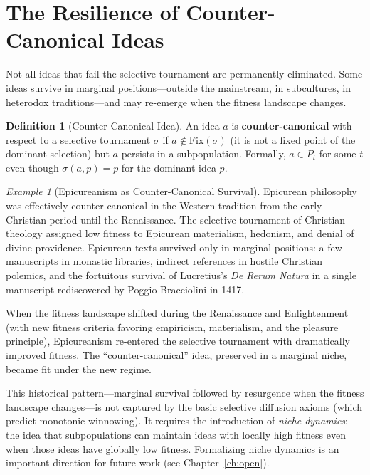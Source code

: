 \documentclass[11pt,openany]{book}
\theoremstyle{definition}
\newtheorem{definition}[axiom]{Definition}
\theoremstyle{plain}
\theoremstyle{remark}
\newtheorem{example}[axiom]{Example}
\begin{document}
\section{The Resilience of Counter-Canonical Ideas}

Not all ideas that fail the selective tournament are permanently eliminated. Some ideas survive in marginal positions---outside the mainstream, in subcultures, in heterodox traditions---and may re-emerge when the fitness landscape changes.

\begin{definition}[Counter-Canonical Idea]
An idea $a$ is \textbf{counter-canonical} with respect to a selective tournament $\sigma$ if $a \notin \mathrm{Fix}(\sigma)$ (it is not a fixed point of the dominant selection) but $a$ persists in a subpopulation. Formally, $a \in P_t$ for some $t$ even though $\sigma(a, p) = p$ for the dominant idea $p$.
\end{definition}

\begin{example}[Epicureanism as Counter-Canonical Survival]
Epicurean philosophy was effectively counter-canonical in the Western tradition from the early Christian period until the Renaissance. The selective tournament of Christian theology assigned low fitness to Epicurean materialism, hedonism, and denial of divine providence. Epicurean texts survived only in marginal positions: a few manuscripts in monastic libraries, indirect references in hostile Christian polemics, and the fortuitous survival of Lucretius's \emph{De Rerum Natura} in a single manuscript rediscovered by Poggio Bracciolini in 1417.

When the fitness landscape shifted during the Renaissance and Enlightenment (with new fitness criteria favoring empiricism, materialism, and the pleasure principle), Epicureanism re-entered the selective tournament with dramatically improved fitness. The ``counter-canonical'' idea, preserved in a marginal niche, became fit under the new regime.

This historical pattern---marginal survival followed by resurgence when the fitness landscape changes---is not captured by the basic selective diffusion axioms (which predict monotonic winnowing). It requires the introduction of \emph{niche dynamics}: the idea that subpopulations can maintain ideas with locally high fitness even when those ideas have globally low fitness. Formalizing niche dynamics is an important direction for future work (see Chapter~\ref{ch:open}).
\end{example}
\end{document}
